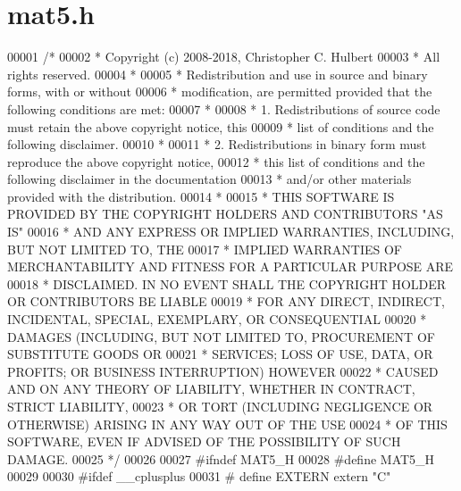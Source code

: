 \hypertarget{mat5_8h_source}{}\section{mat5.\+h}
\label{mat5_8h_source}

\begin{DoxyCode}
00001 \textcolor{comment}{/*}
00002 \textcolor{comment}{ * Copyright (c) 2008-2018, Christopher C. Hulbert}
00003 \textcolor{comment}{ * All rights reserved.}
00004 \textcolor{comment}{ *}
00005 \textcolor{comment}{ * Redistribution and use in source and binary forms, with or without}
00006 \textcolor{comment}{ * modification, are permitted provided that the following conditions are met:}
00007 \textcolor{comment}{ *}
00008 \textcolor{comment}{ * 1. Redistributions of source code must retain the above copyright notice, this}
00009 \textcolor{comment}{ *    list of conditions and the following disclaimer.}
00010 \textcolor{comment}{ *}
00011 \textcolor{comment}{ * 2. Redistributions in binary form must reproduce the above copyright notice,}
00012 \textcolor{comment}{ *    this list of conditions and the following disclaimer in the documentation}
00013 \textcolor{comment}{ *    and/or other materials provided with the distribution.}
00014 \textcolor{comment}{ *}
00015 \textcolor{comment}{ * THIS SOFTWARE IS PROVIDED BY THE COPYRIGHT HOLDERS AND CONTRIBUTORS "AS IS"}
00016 \textcolor{comment}{ * AND ANY EXPRESS OR IMPLIED WARRANTIES, INCLUDING, BUT NOT LIMITED TO, THE}
00017 \textcolor{comment}{ * IMPLIED WARRANTIES OF MERCHANTABILITY AND FITNESS FOR A PARTICULAR PURPOSE ARE}
00018 \textcolor{comment}{ * DISCLAIMED. IN NO EVENT SHALL THE COPYRIGHT HOLDER OR CONTRIBUTORS BE LIABLE}
00019 \textcolor{comment}{ * FOR ANY DIRECT, INDIRECT, INCIDENTAL, SPECIAL, EXEMPLARY, OR CONSEQUENTIAL}
00020 \textcolor{comment}{ * DAMAGES (INCLUDING, BUT NOT LIMITED TO, PROCUREMENT OF SUBSTITUTE GOODS OR}
00021 \textcolor{comment}{ * SERVICES; LOSS OF USE, DATA, OR PROFITS; OR BUSINESS INTERRUPTION) HOWEVER}
00022 \textcolor{comment}{ * CAUSED AND ON ANY THEORY OF LIABILITY, WHETHER IN CONTRACT, STRICT LIABILITY,}
00023 \textcolor{comment}{ * OR TORT (INCLUDING NEGLIGENCE OR OTHERWISE) ARISING IN ANY WAY OUT OF THE USE}
00024 \textcolor{comment}{ * OF THIS SOFTWARE, EVEN IF ADVISED OF THE POSSIBILITY OF SUCH DAMAGE.}
00025 \textcolor{comment}{ */}
00026 
00027 \textcolor{preprocessor}{#ifndef MAT5\_H}
00028 \textcolor{preprocessor}{#define MAT5\_H}
00029 
00030 \textcolor{preprocessor}{#ifdef \_\_cplusplus}
00031 \textcolor{preprocessor}{#   define EXTERN extern "C"}

\end{DoxyCode}
